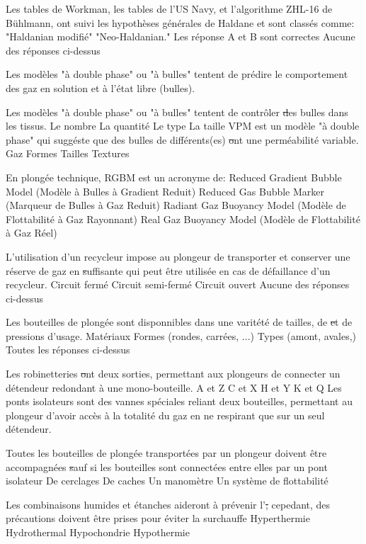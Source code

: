 \documentclass[english,10pt,twoside]{article}
\begin{document}
\begin{outline}
		\1 Les tables de Workman, les tables de l'US Navy, et l'algorithme ZHL-16 de Bühlmann, ont suivi les hypothèses générales de Haldane et sont classés comme:
			\2 "Haldanian modifié"
			\2 "Neo-Haldanian."
			\2 Les réponse A et B sont correctes
			\2 Aucune des réponses ci-dessus

		\1 Les modèles "à double phase" ou "à bulles" tentent de prédire le comportement des gaz en solution et à l'état libre (bulles).\vf

		\1 Les modèles "à double phase" ou "à bulles" tentent de contrôler \st des bulles dans les tissus.
			\2 Le nombre
			\2 La quantité
			\2 Le type
			\2 La taille
		\1 VPM est un modèle "à double phase" qui suggéste que des bulles de différents(es) \st ont une perméabilité variable.
			\2 Gaz
			\2 Formes
			\2 Tailles
			\2 Textures

		\1 En plongée technique, RGBM est un acronyme de:
			\2 Reduced Gradient Bubble Model (Modèle à Bulles à Gradient Reduit)
			\2 Reduced Gas Bubble Marker (Marqueur de Bulles à Gaz Reduit)
			\2 Radiant Gaz Buoyancy Model (Modèle de Flottabilité à Gaz Rayonnant)
			\2 Real Gaz Buoyancy Model (Modèle de Flottabilité à Gaz Réel)

		\1 L'utilisation d'un recycleur impose au plongeur de transporter et conserver une réserve de gaz en \st suffisante qui peut être utilisée en cas de défaillance d'un recycleur.
			\2 Circuit fermé
			\2 Circuit semi-fermé
			\2 Circuit ouvert
			\2 Aucune des réponses ci-dessus

		\1 Les bouteilles de plongée sont disponnibles dans une varitété de tailles, de \st et de pressions d'usage.
			\2 Matériaux
			\2 Formes (rondes, carrées, ...)
			\2 Types (amont, avales,)
			\2 Toutes les réponses ci-dessus


		\1 Les robinetteries \st ont deux sorties, permettant aux plongeurs de connecter un détendeur redondant à une mono-bouteille.
			\2 A et Z
			\2 C et X
			\2 H et Y
			\2 K et Q
		\1 Les ponts isolateurs sont des vannes spéciales reliant deux bouteilles, permettant au plongeur d'avoir accès à la totalité du gaz en ne respirant que sur un seul détendeur.\vf

		\1 Toutes les bouteilles de plongée transportées par un plongeur doivent être accompagnées \st sauf si les bouteilles sont connectées entre elles par un pont isolateur
			\2 De cerclages
			\2 De caches
			\2 Un manomètre
			\2 Un système de flottabilité

		\1 Les combinaisons humides et étanches aideront à prévenir l'\st; cepedant, des précautions doivent être prises pour éviter la surchauffe
			\2 Hyperthermie
			\2 Hydrothermal
			\2 Hypochondrie
			\2 Hypothermie


\end{outline}
\end{document}
